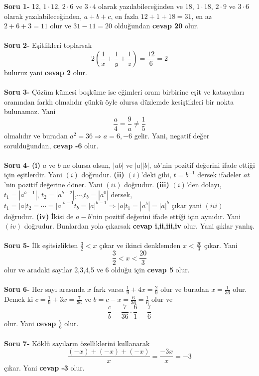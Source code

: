 \documentclass[a4paper,12pt,twocolumn]{article}
\begin{document}
\textbf{Soru 1-} 12, $1\cdot12$, $2\cdot6$ ve $3\cdot4$ olarak yazılabileceğinden ve 18, $1\cdot18$, $2\cdot9$ ve $3\cdot6$ olarak yazılabileceğinden, $a+b+c$, en fazla $12+1+18=31$, en az $2+6+3=11$ olur ve $31-11=20$ olduğundan \textbf{cevap 20} olur.
\\ \\
\textbf{Soru 2-} Eşitlikleri toplarsak $$2\left(\frac{1}{x}+\frac{1}{y}+\frac{1}{z}\right)=\frac{12}{6}=2$$ buluruz yani \textbf{cevap 2} olur.
\\ \\
\textbf{Soru 3-} Çözüm kümesi boşküme ise eğimleri oranı birbirine eşit ve katsayıları oranından farklı olmalıdır çünkü öyle olursa düzlemde kesiştikleri bir nokta bulunamaz. Yani $$\frac{a}{4}=\frac{9}{a}\neq\frac{1}{5}$$ olmalıdır ve buradan $a^2=36\Rightarrow a=6,-6$ gelir. Yani, negatif değer sorulduğundan, \textbf{cevap -6} olur.
\\ \\
\textbf{Soru 4-} \textbf{(i)} $a$ ve $b$ ne olursa olsun, $|ab|$ ve $|a||b|$, $ab$'nin pozitif değerini ifade ettiği için eşitlerdir. Yani $(i)$ doğrudur. \textbf{(ii)} $(i)$'deki gibi, $t=b^{-1}$ dersek ifadeler $at$'nin pozitif değerine döner. Yani $(ii)$ doğrudur. \textbf{(iii)} $(i)$'den dolayı, $t_1=|a^{b-1}|$, $t_2=|a^{b-2}|$,$\cdots$,$t_b=|a^0|$ dersek, $t_1=|a|t_{2}=\cdots=|a|^{b-1}t_b=|a|^{b-1}\Rightarrow |a|t_1=|a^b|=|a|^b$ çıkar yani $(iii)$ doğrudur. \textbf{(iv)} İkisi de $a-b$'nin pozitif değerini ifade ettiği için aynıdır. Yani $(iv)$ doğrudur. Bunlardan yola çıkarsak \textbf{cevap i,ii,iii,iv} olur. Yani şıklar yanlış.
\\ \\
\textbf{Soru 5-} İlk eşitsizlikten $\frac{3}{2}<x$ çıkar ve ikinci denklemden $x<\frac{20}{3}$ çıkar. Yani $$\frac{3}{2}<x<\frac{20}{3}$$ olur ve aradaki sayılar 2,3,4,5 ve 6 olduğu için \textbf{cevap 5} olur.
\\ \\
\textbf{Soru 6-} Her sayı arasında $x$ fark varsa $\frac{1}{9}+4x=\frac{2}{9}$ olur ve buradan $x=\frac{1}{36}$ olur. Demek ki $c=\frac{1}{9}+3x=\frac{7}{36}$ ve $b=c-x=\frac{6}{36}=\frac{1}{6}$ olur ve $$\frac{c}{b}=\frac{7}{36}\cdot\frac{6}{1}=\frac{7}{6}$$ olur. Yani \textbf{cevap $\frac{7}{6}$} olur.
\\ \\
\textbf{Soru 7-} Köklü sayıların özelliklerini kullanarak $$\frac{(-x)+(-x)+(-x)}{x}=\frac{-3x}{x}=-3$$ çıkar. Yani \textbf{cevap -3} olur.
\\ \\
\end{document}
